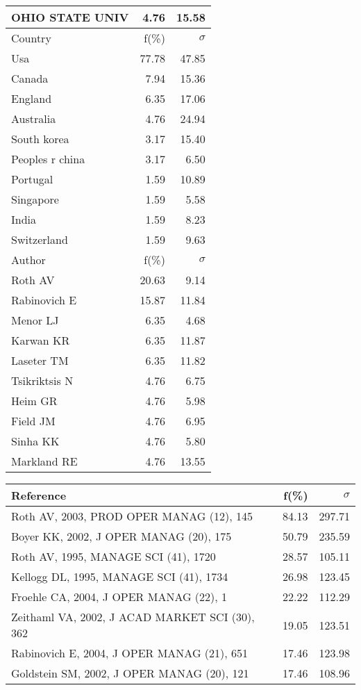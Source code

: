 \documentclass[a4paper,11pt]{report}
\begin{document}
\begin{landscape}
\begin{table}[!ht]
{\begin{tabular}{|l r r|}
OHIO STATE UNIV & 4.76 & 15.58\\
\hline
\hline
Country & f(\%) & $\sigma$\\
\hline
Usa & 77.78 & 47.85\\
Canada & 7.94 & 15.36\\
England & 6.35 & 17.06\\
Australia & 4.76 & 24.94\\
South korea & 3.17 & 15.40\\
Peoples r china & 3.17 & 6.50\\
Portugal & 1.59 & 10.89\\
Singapore & 1.59 & 5.58\\
India & 1.59 & 8.23\\
Switzerland & 1.59 & 9.63\\
\hline
\hline
Author & f(\%) & $\sigma$\\
\hline
Roth AV & 20.63 & 9.14\\
Rabinovich E & 15.87 & 11.84\\
Menor LJ & 6.35 & 4.68\\
Karwan KR & 6.35 & 11.87\\
Laseter TM & 6.35 & 11.82\\
Tsikriktsis N & 4.76 & 6.75\\
Heim GR & 4.76 & 5.98\\
Field JM & 4.76 & 6.95\\
Sinha KK & 4.76 & 5.80\\
Markland RE & 4.76 & 13.55\\
\hline
\end{tabular}
}
{\scriptsize\begin{tabular}{|l r r|}
\hline
Reference & f(\%) & $\sigma$\\
\hline
Roth AV, 2003, PROD OPER MANAG (12), 145 & 84.13 & 297.71\\
Boyer KK, 2002, J OPER MANAG (20), 175 & 50.79 & 235.59\\
Roth AV, 1995, MANAGE SCI (41), 1720 & 28.57 & 105.11\\
Kellogg DL, 1995, MANAGE SCI (41), 1734 & 26.98 & 123.45\\
Froehle CA, 2004, J OPER MANAG (22), 1 & 22.22 & 112.29\\
Zeithaml VA, 2002, J ACAD MARKET SCI (30), 362 & 19.05 & 123.51\\
Rabinovich E, 2004, J OPER MANAG (21), 651 & 17.46 & 123.98\\
Goldstein SM, 2002, J OPER MANAG (20), 121 & 17.46 & 108.96\\

\end{tabular}}
\end{table}
\end{landscape}
\end{document}
